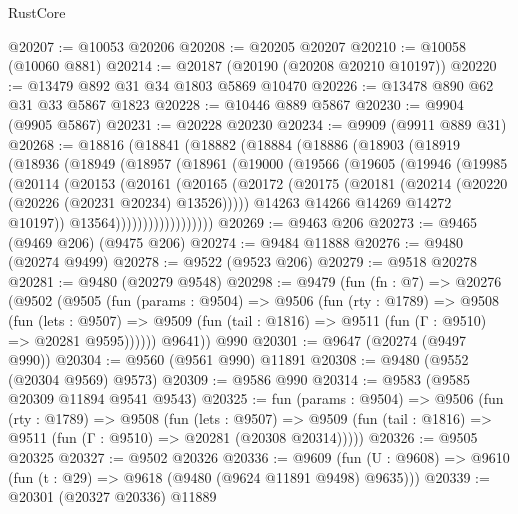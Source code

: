 \begin{lexlean}{RustCore}
\begin{coremodule}
@20207 := @10053 @20206
@20208 := @20205 @20207
@20210 := @10058 (@10060 @881)
@20214 := @20187 (@20190 (@20208 @20210 @10197))
@20220 := @13479 @892 @31 @34 @1803 @5869 @10470
@20226 := @13478 @890 @62 @31 @33 @5867 @1823
@20228 := @10446 @889 @5867
@20230 := @9904 (@9905 @5867)
@20231 := @20228 @20230
@20234 := @9909 (@9911 @889 @31)
@20268 := @18816
    (@18841
      (@18882
        (@18884
          (@18886
            (@18903
              (@18919
                (@18936
                  (@18949
                    (@18957
                      (@18961
                        (@19000
                          (@19566
                            (@19605
                              (@19946
                                (@19985
                                  (@20114
                                    (@20153
                                      (@20161
                                        (@20165
                                          (@20172
                                            (@20175
                                              (@20181
                                                (@20214 (@20220 (@20226 (@20231 @20234) @13526)))))
                                            @14263
                                            @14266
                                            @14269
                                            @14272
                                            @10197))
                                        @13564))))))))))))))))))
@20269 := @9463 @206
@20273 := @9465 (@9469 @206) (@9475 @206)
@20274 := @9484 @11888
@20276 := @9480 (@20274 @9499)
@20278 := @9522 (@9523 @206)
@20279 := @9518 @20278
@20281 := @9480 (@20279 @9548)
@20298 := @9479
    (fun (fn : @7) =>
    @20276
      (@9502
        (@9505
          (fun (params : @9504) =>
          @9506
            (fun (rty : @1789) =>
            @9508
              (fun (lets : @9507) =>
              @9509 (fun (tail : @1816) => @9511 (fun (Γ : @9510) => @20281 @9595))))))
        @9641))
    @990
@20301 := @9647 (@20274 (@9497 @990))
@20304 := @9560 (@9561 @990) @11891
@20308 := @9480 (@9552 (@20304 @9569) @9573)
@20309 := @9586 @990
@20314 := @9583 (@9585 @20309 @11894 @9541 @9543)
@20325 := fun (params : @9504) =>
  @9506
    (fun (rty : @1789) =>
    @9508
      (fun (lets : @9507) =>
      @9509 (fun (tail : @1816) => @9511 (fun (Γ : @9510) => @20281 (@20308 @20314)))))
@20326 := @9505 @20325
@20327 := @9502 @20326
@20336 := @9609
    (fun (U : @9608) => @9610 (fun (t : @29) => @9618 (@9480 (@9624 @11891 @9498) @9635)))
@20339 := @20301 (@20327 @20336) @11889

\end{coremodule}
\end{lexlean}
